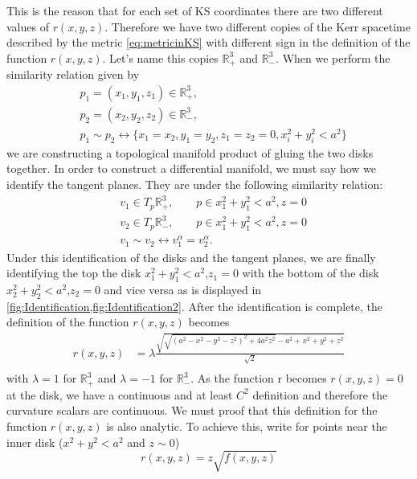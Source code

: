 \begin{Proof}
\begin{figure}
\end{figure} 
This is the reason that for each set of \gls{KS} coordinates there are two different values of $r(x,y,z)$. Therefore we have two different copies of the Kerr spacetime described by the metric \cref{eq:metricinKS} with different sign in the definition of the function $r(x,y,z)$. Let's name this copies $\mathbb{R}_+^3$ and $\mathbb{R}_-^3$. When we perform the similarity relation given by \begin{align}
 &p_1=(x_1,y_1,z_1) \in \mathbb{R}_+^3 \nonumber, \\
 &p_2=(x_2,y_2,z_2) \in \mathbb{R}_-^3 \nonumber, \\
 &p_1 \sim p_2 \longleftrightarrow \{ x_1=x_2, y_1=y_2 ,z_1=z_2=0, x_i^2+y_i^2<a^2 \}
\end{align}
we are constructing a topological manifold product of gluing the two disks together. In order to construct a differential manifold, we must say how we identify the tangent planes. They are under the following similarity relation:
\begin{align}
 &v_1 \in T_p\mathbb{R}_+^3,\quad \quad p \in x_1^2+y_1^2<a^2, z=0\\
 &v_2 \in T_p\mathbb{R}_-^3,\quad \quad p \in x_1^2+y_1^2<a^2, z=0\\
 &v_1 \sim v_2 \longleftrightarrow v_1^\alpha = v_2^\alpha.
\end{align}
Under this identification of the disks and the tangent planes, we are finally identifying the top the disk $x_1^2+y_1^2<a^2$,$z_1=0$ with the bottom of the disk $x_2^2+y_2^2<a^2$,$z_2=0$ and vice versa as is displayed in \vref{fig:Identification,fig:Identification2}. After the identification is complete, the definition of the function $r(x,y,z)$ becomes
\begin{align}\label{eq:rdefinitiondef}
  r(x,y,z)&=\lambda \frac{\sqrt{\sqrt{\left(a^2-x^2-y^2-z^2\right)^2+4 a^2 z^2}-a^2+x^2+y^2+z^2}}{\sqrt{2}}\\
 \end{align}
 with $\lambda=1$ for $\mathbb{R}_+^3$ and $\lambda=-1$ for $\mathbb{R}_-^3$. As the function r becomes $r(x,y,z)=0$ at the disk, we have a continuous and at least $C^2$ definition and therefore the curvature scalars are continuous. We must proof that this definition for the function $r(x,y,z)$ is also analytic. To achieve this, write for points near the inner disk ($x^2+y^2<a^2$ and $z\sim 0$)
 \begin{equation}
  r(x,y,z)=z \sqrt{f(x,y,z)}
 \end{equation}

\end{Proof}
